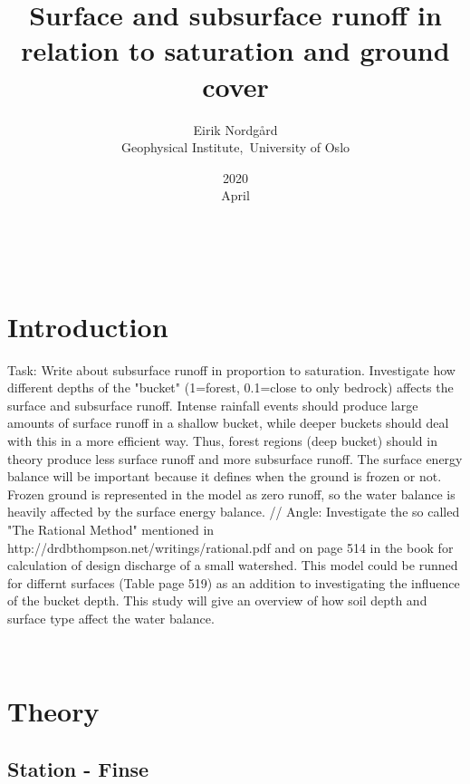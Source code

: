 \documentclass[a4paper,11pt,twocolumn]{article}
\begin{document}
\title{Surface and subsurface runoff in relation to saturation and ground cover}
\date{2020\\ April}
\author{Eirik Nordgård\\ Geophysical Institute,\ University of Oslo}


\
\section{Introduction}

Task: Write about subsurface runoff in proportion to saturation. Investigate how different depths of the "bucket" (1=forest, 0.1=close to only bedrock) affects the surface and subsurface runoff. Intense rainfall events should produce large amounts of surface runoff in a shallow bucket, while deeper buckets should deal with this in a more efficient way. Thus, forest regions (deep bucket) should in theory produce less surface runoff and more subsurface runoff. The surface energy balance will be important because it defines when the ground is frozen or not. Frozen ground is represented in the model as zero runoff, so the water balance is heavily affected by the surface energy balance. 
//
Angle: Investigate the so called "The Rational Method" mentioned in http://drdbthompson.net/writings/rational.pdf and on page 514 in the book for calculation of design discharge of a small watershed. This model could be runned for differnt surfaces (Table page 519) as an addition to investigating the influence of the bucket depth. This study will give an overview of how soil depth and surface type affect the water balance. 
 
\
\section{Theory}

\subsection{Station - Finse} 
\end{document}
